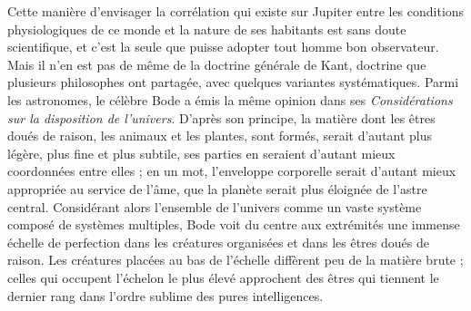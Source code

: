 \documentclass[a4paper, 11pt, oneside, landscape]{article}
\begin{document}
Cette manière d'envisager la corrélation qui existe sur Jupiter entre les conditions physiologiques de ce monde et la nature de ses habitants est sans doute scientifique, et c'est la seule que puisse adopter tout homme bon observateur. Mais il n'en est pas de même de la doctrine générale de Kant, doctrine que plusieurs philosophes ont partagée, avec quelques variantes systématiques. Parmi les astronomes, le célèbre Bode a émis la même opinion dans ses \emph{Considérations sur la disposition de l'univers}. D'après son principe, la matière dont les êtres doués de raison, les animaux et les plantes, sont formés, serait d'autant plus légère, plus fine et plus subtile, ses parties en seraient d'autant mieux coordonnées entre elles ; en un mot, l'enveloppe corporelle serait d'autant mieux appropriée au service de l'âme, que la planète serait plus éloignée de l'astre central. Considérant alors l'ensemble de l'univers comme un vaste système composé de systèmes multiples, Bode voit du centre aux extrémités une immense échelle de perfection dans les créatures organisées et dans les êtres doués de raison. Les créatures placées au bas de l'échelle diffèrent peu de la matière brute ; celles qui occupent l'échelon le plus élevé approchent des êtres qui tiennent le dernier rang dans l'ordre sublime des pures intelligences.
\end{document}
